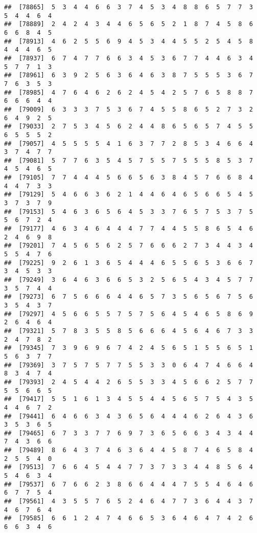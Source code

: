 \documentclass[
]{book}
\begin{document}
\begin{verbatim}
##  [78865]  5  3  4  4  6  6  3  7  4  5  3  4  8  8  6  5  7  7  3  5  4  4  6  4
##  [78889]  2  4  2  4  3  4  4  6  5  6  5  2  1  8  7  4  5  8  6  6  6  8  4  5
##  [78913]  4  6  2  5  5  6  9  4  5  3  4  4  5  5  2  5  4  5  8  4  4  4  6  5
##  [78937]  6  7  4  7  7  6  6  3  4  5  3  6  7  7  4  4  6  3  4  5  7  7  1  3
##  [78961]  6  3  9  2  5  6  3  6  4  6  3  8  7  5  5  5  3  6  7  7  6  3  5  3
##  [78985]  4  7  6  4  6  2  6  2  4  5  4  2  5  7  6  5  8  8  7  6  6  6  4  4
##  [79009]  6  3  3  3  7  5  3  6  7  4  5  5  8  6  5  2  7  3  2  6  4  9  2  5
##  [79033]  2  7  5  3  4  5  6  2  4  4  8  6  5  6  5  7  4  5  5  6  5  5  5  2
##  [79057]  4  5  5  5  5  4  1  6  3  7  7  2  8  5  3  4  6  6  4  3  7  4  7  7
##  [79081]  5  7  7  6  3  5  4  5  7  5  5  7  5  5  5  8  5  3  7  4  5  4  6  5
##  [79105]  7  7  4  4  4  5  6  6  5  6  3  8  4  5  7  6  6  8  4  4  4  7  3  3
##  [79129]  5  4  6  6  3  6  2  1  4  4  6  4  6  5  6  6  5  4  5  3  7  3  7  9
##  [79153]  5  4  6  3  6  5  6  4  5  3  3  7  6  5  7  5  3  7  5  5  6  7  2  4
##  [79177]  4  6  3  4  6  4  4  4  7  7  4  4  5  5  8  6  5  4  6  2  4  6  9  8
##  [79201]  7  4  5  6  5  6  2  5  7  6  6  6  2  7  3  4  4  3  4  5  5  4  7  6
##  [79225]  9  2  6  1  3  6  5  4  4  4  6  5  5  6  5  3  6  6  7  3  4  5  3  3
##  [79249]  3  6  4  6  3  6  6  5  3  2  5  6  5  4  3  4  5  7  7  3  5  7  4  4
##  [79273]  6  7  5  6  6  6  4  4  6  5  7  3  5  6  5  6  7  5  6  3  5  4  3  7
##  [79297]  4  5  6  6  5  5  7  5  7  5  6  4  5  4  6  5  8  6  9  2  6  4  6  4
##  [79321]  5  7  8  3  5  5  8  5  6  6  6  4  5  6  4  6  7  3  3  2  4  7  8  2
##  [79345]  7  3  9  6  9  6  7  4  2  4  5  6  5  1  5  5  6  5  1  5  6  3  7  7
##  [79369]  3  7  5  7  5  7  7  5  5  3  3  0  6  4  7  4  6  6  4  8  3  4  7  4
##  [79393]  2  4  5  4  4  2  6  5  5  3  3  4  5  6  6  2  5  7  7  5  5  6  6  5
##  [79417]  5  5  1  6  1  3  4  5  5  4  4  5  6  5  7  5  4  3  5  4  4  6  7  2
##  [79441]  6  4  6  6  3  4  3  6  5  6  4  4  4  6  2  6  4  3  6  3  5  3  6  5
##  [79465]  6  7  3  3  7  7  6  9  7  3  6  5  6  6  3  4  3  4  4  7  4  3  6  6
##  [79489]  8  6  4  3  7  4  6  3  6  4  4  5  8  7  4  6  5  8  4  2  5  5  4  0
##  [79513]  7  6  6  4  5  4  4  7  7  3  7  3  3  4  4  8  5  6  4  5  4  6  3  4
##  [79537]  6  7  6  6  2  3  8  6  6  4  4  4  7  5  5  4  6  4  6  6  7  7  5  4
##  [79561]  4  3  5  5  7  6  5  2  4  6  4  7  7  3  6  4  4  3  7  4  6  7  6  4
##  [79585]  6  6  1  2  4  7  4  6  6  5  3  6  4  6  4  7  4  2  6  6  6  3  4  6

\end{verbatim}
\end{document}

